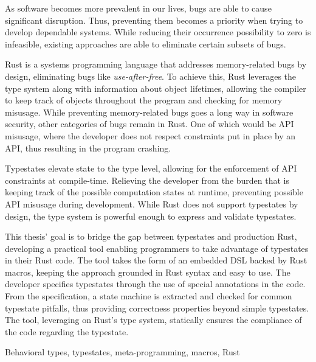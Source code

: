 
As software becomes more prevalent in our lives, bugs are able to cause significant disruption.
Thus, preventing them becomes a priority when trying to develop dependable systems.
While reducing their occurrence possibility to zero is infeasible,
existing approaches are able to eliminate certain subsets of bugs.

Rust is a systems programming language that addresses memory-related bugs by design,
eliminating bugs like \emph{use-after-free}.
To achieve this, Rust leverages the type system along with information about object lifetimes,
allowing the compiler to keep track of objects throughout the program and checking for memory misusage.
While preventing memory-related bugs goes a long way in software security, other categories of bugs remain in Rust.
One of which would be API misusage, where the developer does not respect constraints put in place by an API,
thus resulting in the program crashing.

Typestates elevate state to the type level, allowing for the enforcement of API constraints at compile-time.
Relieving the developer from the burden that is keeping track of the possible computation states at runtime,
preventing possible API misusage during development.
While Rust does not support typestates by design,
the type system is powerful enough to express and validate typestates.

This thesis' goal is to bridge the gap between typestates and production Rust,
developing a practical tool enabling programmers to take advantage of typestates in their Rust code.
The tool takes the form of an embedded DSL backed by Rust macros,
keeping the approach grounded in Rust syntax and easy to use.
The developer specifies typestates through the use of special annotations in the code.
From the specification, a state machine is extracted and checked for common typestate pitfalls,
thus providing correctness properties beyond simple typestates.
The tool, leveraging on Rust's type system, statically ensures the compliance of the code regarding the typestate.

\begin{keywords}
Behavioral types, typestates, meta-programming, macros, Rust
\end{keywords}

